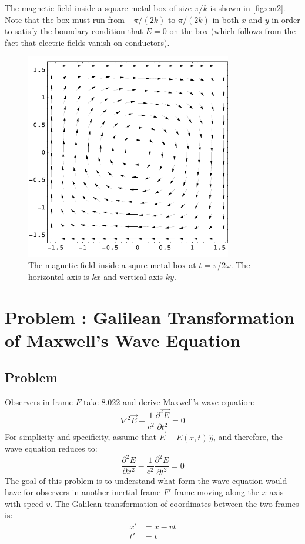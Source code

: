 \documentclass[solutions]{esg8022pset}
\begin{document}
  The magnetic field inside a square metal box of size $\pi/k$ is shown
  in \autoref{fig:em2}.  Note that the box must run from $-\pi/(2k)$ to
  $\pi/(2k)$ in both $x$ and $y$ in order to satisfy the boundary
  condition that $E = 0$ on the box (which follows from the fact that
  electric fields vanish on conductors).

  \begin{figure}[H]
    \centering
    \includegraphics[width = 9cm]{em2}
    \caption{The magnetic field inside a squre metal box at
      $t=\pi/2\omega$.  The horizontal axis is $kx$ and vertical axis $ky$.}
    \label{fig:em2}
  \end{figure}

\section{Problem \thesection: Galilean Transformation of Maxwell's Wave Equation}
\subsection{Problem}
  Observers in frame $F$ take 8.022 and derive Maxwell's wave equation:
  $$\nabla^2\vec{E} - \frac{1}{c^2} \frac{\partial^2\vec{E}}{\partial t^2} = 0$$
  For simplicity and specificity, assume that $\vec{E} = E(x,t)\, \hat{y}$, and therefore, the wave equation reduces to:
  $$\frac{\partial^2E}{\partial x^2} - \frac{1}{c^2} \frac{\partial^2E}{\partial t^2} = 0$$
  The goal of this problem is to understand what form the wave equation would have for observers in another inertial frame $F'$ frame moving along the $x$ axis with speed $v$.  The Galilean transformation of coordinates between the two frames is:
  \begin{align*}
    x' & = x - vt \\
    t' & = t
  \end{align*}
\end{document}
